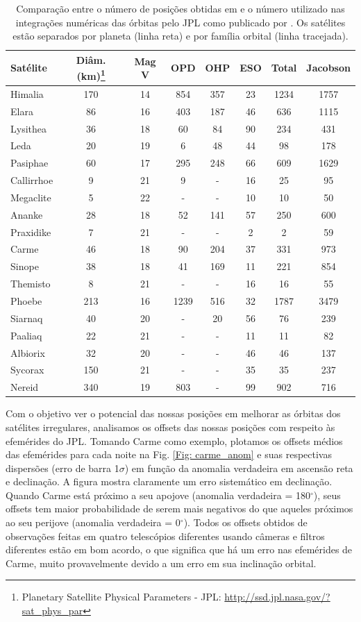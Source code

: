 \documentclass[12pt,a4paper]{monografia}
\newcommand{\degr}{\ensuremath{^{\circ}}}%
\begin{document}
\begin{table}[h]
\caption{Comparação entre o número de posições obtidas em \cite{GomesJunior2015-Irregular} e o número utilizado nas integrações numéricas das órbitas pelo JPL como publicado por  \cite{Jacobson2012}. Os satélites estão separados por planeta (linha reta) e por família orbital (linha tracejada).}
\label{Tab: comparison-horizons}
\begin{centering}
\begin{tabular}{lccccccc}
\hline  \hline
Satélite & Diâm. (km)\footnote{Planetary Satellite Physical Parameters - JPL: \url{http://ssd.jpl.nasa.gov/?sat_phys_par}} & Mag V  & OPD  & OHP & ESO & Total  & Jacobson \tabularnewline
\hline
Himalia & 170 & 14 & 854 & 357 & 23 & 1234 & 1757 \tabularnewline
Elara & 86 & 16 & 403 & 187 & 46 & 636 & 1115 \tabularnewline
Lysithea & 36 & 18 & 60 & 84 & 90 & 234 & 431 \tabularnewline
Leda & 20 & 19 & 6 & 48 & 44 & 98 & 178 \tabularnewline
\hdashline
Pasiphae & 60 & 17 & 295 & 248 & 66 & 609 & 1629 \tabularnewline
Callirrhoe & 9 & 21 & 9 & -  &  16 & 25 & 95 \tabularnewline
Megaclite & 5 & 22 & - & -  &  10 & 10 & 50  \tabularnewline
\hdashline
Ananke & 28 & 18 & 52 & 141 & 57 & 250 & 600 \tabularnewline
Praxidike & 7 & 21 & - & -  &   2 & 2 & 59 \tabularnewline
\hdashline
Carme & 46 & 18 & 90 & 204 & 37 & 331 & 973 \tabularnewline
Sinope & 38 & 18 & 41 & 169 & 11 & 221 & 854 \tabularnewline
Themisto & 8 & 21 & - & - & 16 & 16 & 55 \tabularnewline
\hline
Phoebe & 213 & 16 & 1239 & 516 & 32 & 1787 & 3479 \tabularnewline
\hdashline
Siarnaq & 40 & 20 & - & 20 & 56 & 76 & 239 \tabularnewline
Paaliaq & 22 & 21 & - & - & 11 & 11 & 82 \tabularnewline
\hdashline
Albiorix & 32 & 20 & - & - & 46 & 46 & 137 \tabularnewline
\hline
Sycorax & 150 & 21 & - & - & 35 & 35 & 237 \tabularnewline
\hline
Nereid & 340 & 19 & 803 & - & 99 & 902 & 716 \tabularnewline
\hline
\end{tabular}
\par\end{centering}
\end{table}

Com o objetivo ver o potencial das nossas posições em melhorar as órbitas dos satélites irregulares, analisamos os offsets das nossas posições com respeito às efemérides do JPL. Tomando Carme como exemplo, plotamos os offsets médios das efemérides para cada noite na Fig. \ref{Fig: carme_anom} e suas respectivas dispersões (erro de barra 1$\sigma$) em função da anomalia verdadeira em ascensão reta e declinação. A figura mostra claramente um erro sistemático em declinação. Quando Carme está próximo a seu apojove (anomalia verdadeira = 180$\degr$), seus offsets tem maior probabilidade de serem mais negativos do que aqueles próximos ao seu perijove (anomalia verdadeira = 0$\degr$). Todos os offsets obtidos de observações feitas em quatro telescópios diferentes usando câmeras e filtros diferentes estão em bom acordo, o que significa que há um erro nas efemérides de Carme, muito provavelmente devido a um erro em sua inclinação orbital.
\end{document}
